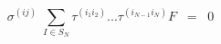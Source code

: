 \begin{equation}
\sigma^{(ij)} \; \sum_{I \in S_N} \tau^{( i_1 i_2 )} ... \tau^{( i_{N-1} i_N )} F \;\; =\;\; 0
\label{eq:x5}
\end{equation}

